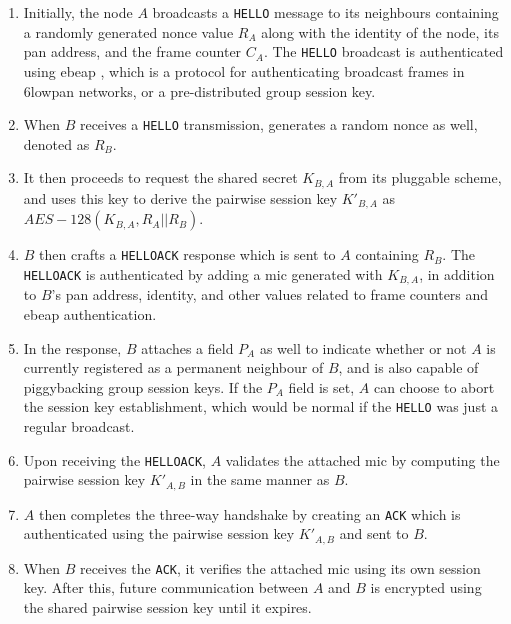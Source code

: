 \begin{enumerate}

\item  Initially, the node $A$ broadcasts a \texttt{HELLO} message to its neighbours containing a randomly generated nonce value $R_A$ along with the identity of the node, its \gls{pan} address, and the frame counter $C_A$. The \texttt{HELLO} broadcast is authenticated using \gls{ebeap} \cite{krentz20136lowpan}, which is a protocol for authenticating broadcast frames in \gls{6lowpan} networks, or a pre-distributed group session key.

\item When $B$ receives a \texttt{HELLO} transmission, generates a random nonce as well, denoted as $R_B$.

\item It then proceeds to request the shared secret $K_{B,A}$ from its pluggable scheme, and uses this key to derive the pairwise session key $K'_{B,A}$ as\\ $AES-128(K_{B,A}, R_A || R_B)$.

\item $B$ then crafts a \texttt{HELLOACK} response which is sent to $A$ containing $R_B$. The \texttt{HELLOACK} is authenticated by adding a \gls{mic} generated with $K_{B,A}$, in addition to $B$'s \gls{pan} address, identity, and other values related to frame counters and \gls{ebeap} authentication.

\item In the response, $B$ attaches a field $P_A$ as well to indicate whether or not $A$ is currently registered as a permanent neighbour of $B$, and is also capable of piggybacking group session keys. If the $P_A$ field is set, $A$ can choose to abort the session key establishment, which would be normal if the \texttt{HELLO} was just a regular broadcast.

\item  Upon receiving the \texttt{HELLOACK}, $A$ validates the attached \gls{mic} by computing the pairwise session key $K'_{A, B}$ in the same manner as $B$.

\item $A$ then completes the three-way handshake by creating an \texttt{ACK} which is authenticated using the pairwise session key $K'_{A, B}$ and sent to $B$.


\item  When $B$ receives the \texttt{ACK}, it verifies the attached \gls{mic} using its own session key. After this, future communication between $A$ and $B$ is encrypted using the shared pairwise session key until it expires.


\end{enumerate}

